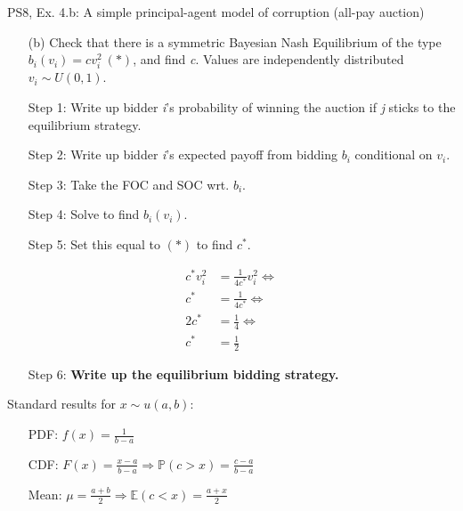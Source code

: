 \begin{frame}{PS8, Ex. 4.b: A simple principal-agent model of corruption (all-pay auction)}
    \begin{itemize}
      \item[(b)] Check that there is a symmetric Bayesian Nash Equilibrium of the type $b_i(v_i) = cv_i^2\ (*)$, and find \textit{c}. Values are independently distributed $v_i\sim U(0, 1)$.
    \end{itemize} \vspace{-8pt}
    \begin{multicols}{2}
      \begin{itemize}
        \item[Step 1:] Write up bidder \textit{i}'s probability of winning the auction if \textit{j} sticks to the equilibrium strategy.
        \item[Step 2:] Write up bidder \textit{i}'s expected payoff from bidding $b_i$ conditional on $v_i$.
        \item[Step 3:] Take the FOC and SOC wrt. $b_i$.
        \item[Step 4:] Solve to find $b_i(v_i)$.
        \item[Step 5:] Set this equal to $(*)$ to find $c^*$.
      \end{itemize} \vspace{-6pt}
      \begin{align*}
        c^*v_i^2&=\frac{1}{4c^*}v_i^2\Leftrightarrow\\
        c^*&=\frac{1}{4c^*}\Leftrightarrow\\
        2c^*&=\frac{1}{4}\Leftrightarrow\\
        c^*&=\frac{1}{2}
      \end{align*} \vspace{-12pt}
      \begin{itemize}
        \item[Step 6:] \textbf{Write up the equilibrium bidding strategy.}
      \end{itemize}
      \vfill\null\columnbreak
      Standard results for $x\sim u(a, b):$ \vspace{-6pt}
      \begin{itemize}
        \item[PDF:] $f(x)=\frac{1}{b-a}$
        \item[CDF:] $F(x)=\frac{x-a}{b-a}\Rightarrow\mathbb{P}(c>x)=\frac{c-a}{b-a}$
        \item[Mean:] $\mu=\frac{a+b}{2}\Rightarrow\mathbb{E}(c<x)=\frac{a+x}{2}$

\end{itemize}
\end{multicols}
\end{frame}
